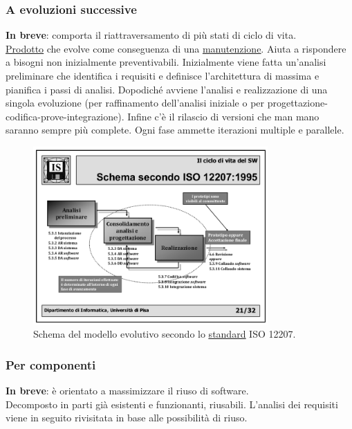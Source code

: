 			\subsubsection{A evoluzioni successive} 
			\textbf{In breve}: comporta il riattraversamento di più stati di ciclo di vita. \\
			 \underline{\hyperref[prodotto]{Prodotto}} che evolve come conseguenza di una \underline{\hyperref[manutenzione]{manutenzione}}. Aiuta a rispondere a bisogni non inizialmente preventivabili. Inizialmente viene fatta un'analisi preliminare che identifica i requisiti e definisce l'architettura di massima e pianifica i passi di analisi. Dopodiché avviene l'analisi e realizzazione di una singola evoluzione (per raffinamento dell'analisi iniziale o per progettazione-codifica-prove-integrazione). Infine c'è il rilascio di versioni che man mano saranno sempre più complete. Ogni fase ammette iterazioni multiple e parallele.

			 \begin{figure}[H]
			 	\centering
			 	\includegraphics[width=0.8\textwidth]{img/evoluzione}
			 	\caption{Schema del modello evolutivo secondo lo \underline{\hyperref[standard]{standard}} ISO 12207.}
			 \end{figure}

			\subsubsection{Per componenti} 
			\textbf{In breve}: è orientato a massimizzare il riuso di software. \\
			 Decomposto in parti già esistenti e funzionanti, riusabili. L'analisi dei requisiti viene in seguito rivisitata in base alle possibilità di riuso.

